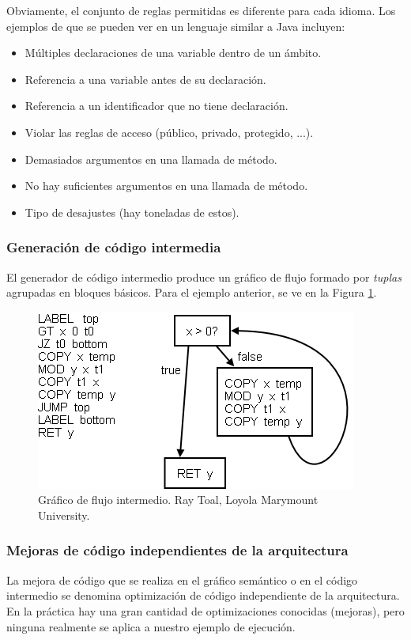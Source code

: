 Obviamente, el conjunto de reglas permitidas es diferente para cada idioma. Los ejemplos de que se pueden ver en un lenguaje similar a Java incluyen:
\begin{itemize}
    \item Múltiples declaraciones de una variable dentro de un ámbito.
    \item Referencia a una variable antes de su declaración.
    \item Referencia a un identificador que no tiene declaración.
    \item Violar las reglas de acceso (público, privado, protegido, ...).
    \item Demasiados argumentos en una llamada de método.
    \item No hay suficientes argumentos en una llamada de método.
    \item Tipo de desajustes (hay toneladas de estos).
\end{itemize}

\subsubsection{Generación de código intermedia}
El generador de código intermedio produce un gráfico de flujo formado por \textit{tuplas} agrupadas en bloques básicos. Para el ejemplo anterior, se ve en la Figura \ref{fig:flowchart intermediate}.

\begin{figure}[h]
    \centering
    \includegraphics[scale=0.3]{images/gcdflowgraph.png}
    \caption{Gráfico de flujo intermedio. Ray Toal, Loyola Marymount University.}
    \label{fig:flowchart intermediate}
\end{figure}

\subsubsection{Mejoras de código independientes de la arquitectura}
La mejora de código que se realiza en el gráfico semántico o en el código intermedio se denomina optimización de código independiente de la arquitectura. En la práctica hay una gran cantidad de optimizaciones conocidas\cite{srikant2018compiler}\cite{emmanuel2017newtrends} (mejoras), pero ninguna realmente se aplica a nuestro ejemplo de ejecución.

